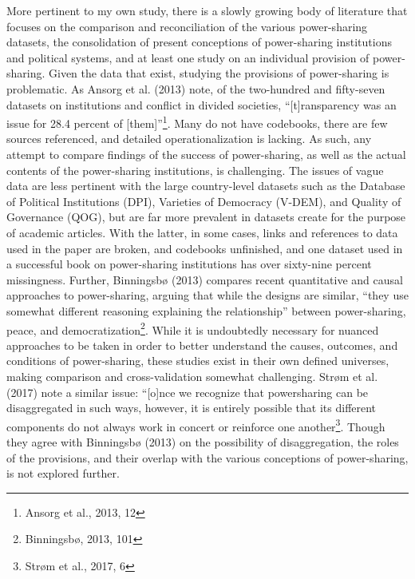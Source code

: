 \documentclass[12pt]{article}
\begin{document}
More pertinent to my own study, there is a slowly growing body of literature that focuses on the comparison and reconciliation of the various power-sharing datasets, the consolidation of present conceptions of power-sharing institutions and political systems, and at least one study on an individual provision of power-sharing. Given the data that exist, studying the provisions of power-sharing is problematic. As Ansorg et al. (2013) note, of the two-hundred and fifty-seven datasets on institutions and conflict in divided societies, “[t]ransparency was an issue for 28.4 percent of [them]”\footnote{Ansorg et al., 2013, 12}. Many do not have codebooks, there are few sources referenced, and detailed operationalization is lacking. As such, any attempt to compare findings of the success of power-sharing, as well as the actual contents of the power-sharing institutions, is challenging. The issues of vague data are less pertinent with the large country-level datasets such as the Database of Political Institutions (DPI), Varieties of Democracy (V-DEM), and Quality of Governance (QOG), but are far more prevalent in datasets create for the purpose of academic articles. With the latter, in some cases, links and references to data used in the paper are broken, and codebooks unfinished, and one dataset used in a successful book on power-sharing institutions has over sixty-nine percent missingness. Further, Binningsbø (2013) compares recent quantitative and causal approaches to power-sharing, arguing that while the designs are similar, “they use somewhat different reasoning explaining the relationship” between power-sharing, peace, and democratization\footnote{Binningsbø, 2013, 101}. While it is undoubtedly necessary for nuanced approaches to be taken in order to better understand the causes, outcomes, and conditions of power-sharing, these studies exist in their own defined universes, making comparison and cross-validation somewhat challenging. Strøm et al. (2017) note a similar issue: “[o]nce we recognize that powersharing can be disaggregated in such ways, however, it is entirely possible that its different components do not always work in concert or reinforce one another\footnote{Strøm et al., 2017, 6}. Though they agree with Binningsbø (2013) on the possibility of disaggregation, the roles of the provisions, and their overlap with the various conceptions of power-sharing, is not explored further.  
\end{document}
